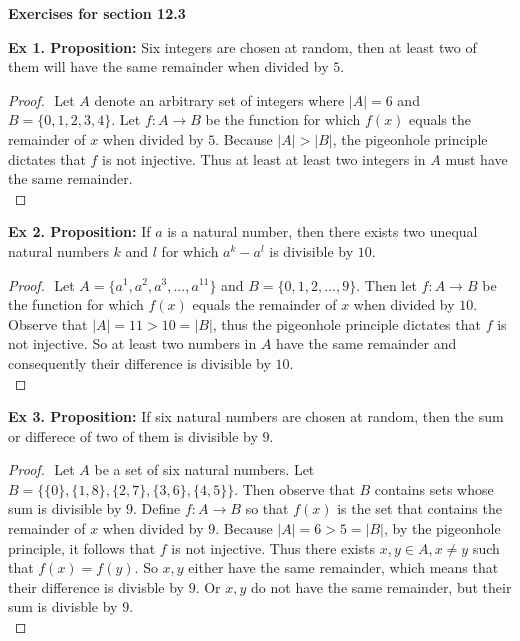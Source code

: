 \documentclass{article}
\date{}
\author{}
\begin{document}
\centerline{\textbf{Exercises for section 12.3}}

\textbf{Ex 1. Proposition:} Six integers are chosen at random, then at least two of them will have the same remainder when divided by $5$.
\begin{proof}
$ $\newline
Let $A$ denote an arbitrary set of integers where $|A|=6$ and $B=\{0,1,2,3,4\}$. Let $f: A \rightarrow B$ be the function for which $f(x)$ equals the remainder of $x$ when divided by $5$. Because $|A| > |B|$, the pigeonhole principle dictates that $f$ is not injective. Thus at least at least two integers in $A$ must have the same remainder.\\
\end{proof}

\textbf{Ex 2. Proposition:} If $a$ is a natural number, then there exists two unequal natural numbers $k$ and $l$ for which $a^k-a^l$ is divisible by $10$.
\begin{proof}
$ $\newline
Let $A=\{a^1, a^2, a^3, ..., a^{11}\}$ and $B=\{0,1,2,...,9\}$. Then let $f: A \rightarrow B$ be the function for which $f(x)$ equals the remainder of $x$ when divided by $10$. Observe that $|A|=11 > 10 = |B|$, thus the pigeonhole principle dictates that $f$ is not injective. So at least two numbers in $A$ have the same remainder and consequently their difference is divisible by $10$.\\
\end{proof}

\textbf{Ex 3. Proposition:} If six natural numbers are chosen at random, then the sum or differece of two of them is divisible by $9$.
\begin{proof}
$ $\newline
Let $A$ be a set of six natural numbers. Let $B=\{\{0\}, \{1,8\}, \{2,7\}, \{3,6\}, \{4,5\}\}$. Then observe that $B$ contains sets whose sum is divisible by $9$. Define $f: A \rightarrow B$ so that $f(x)$ is the set that contains the remainder of $x$ when divided by $9$. Because $|A| = 6 > 5 = |B|$, by the pigeonhole principle, it follows that $f$ is not injective. Thus there exists $x, y \in A, x \neq y$ such that $f(x)=f(y)$. So $x, y$ either have the same remainder, which means that their difference is divisble by $9$. Or $x, y$ do not have the same remainder, but their sum is divisble by $9$.\\
\end{proof}
\end{document}
